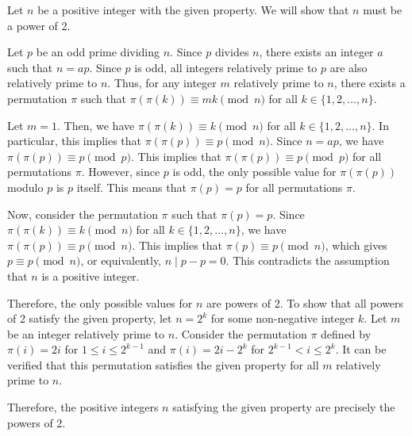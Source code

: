 Let \( n \) be a positive integer with the given property. We will show that \( n \) must be a power of 2.

Let \( p \) be an odd prime dividing \( n \). Since \( p \) divides \( n \), there exists an integer \( a \) such that \( n = ap \). Since \( p \) is odd, all integers relatively prime to \( p \) are also relatively prime to \( n\). Thus, for any integer \( m \) relatively prime to \( n \), there exists a permutation \( \pi \) such that \( \pi(\pi(k)) \equiv mk \pmod{n} \) for all \( k \in \{1,2,\dots,n\} \).

Let \( m = 1 \). Then, we have \( \pi(\pi(k)) \equiv k \pmod{n} \) for all \( k \in \{1,2,\dots,n\} \). In particular, this implies that \( \pi(\pi(p)) \equiv p \pmod{n} \). Since \( n = ap \), we have \( \pi(\pi(p)) \equiv p \pmod{p} \). This implies that \( \pi(\pi(p)) \equiv p \pmod{p} \) for all permutations \( \pi \). However, since \( p \) is odd, the only possible value for \( \pi(\pi(p)) \) modulo \( p \) is \( p \) itself. This means that \( \pi(p) = p \) for all permutations \( \pi \).

Now, consider the permutation \( \pi \) such that \( \pi(p) = p \). Since \( \pi(\pi(k)) \equiv k \pmod{n} \) for all \( k \in \{1,2,\dots,n\} \), we have \( \pi(\pi(p)) \equiv p \pmod{n} \). This implies that \( \pi(p) \equiv p \pmod{n} \), which gives \( p \equiv p \pmod{n} \), or equivalently, \( n \mid p - p = 0 \). This contradicts the assumption that \( n \) is a positive integer.

Therefore, the only possible values for \( n \) are powers of 2. To show that all powers of 2 satisfy the given property, let \( n = 2^k \) for some non-negative integer \( k \). Let \( m \) be an integer relatively prime to \( n \). Consider the permutation \( \pi \) defined by \( \pi(i) = 2i \) for \( 1 \leq i \leq 2^{k-1} \) and \( \pi(i) = 2i - 2^{k} \) for \( 2^{k-1} < i \leq 2^{k} \). It can be verified that this permutation satisfies the given property for all \( m \) relatively prime to \( n \).

Therefore, the positive integers \( n \) satisfying the given property are precisely the powers of 2.

